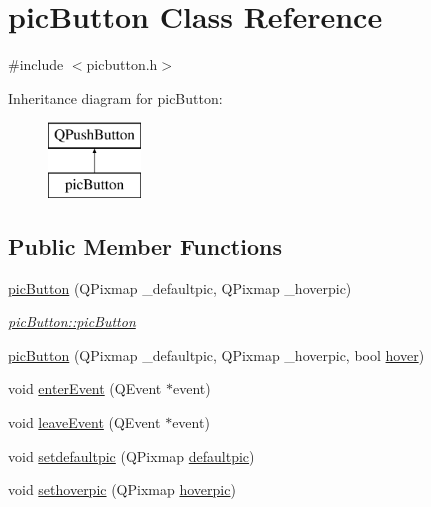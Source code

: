 \hypertarget{classpic_button}{}\section{pic\+Button Class Reference}
\label{classpic_button}


{\ttfamily \#include $<$picbutton.\+h$>$}

Inheritance diagram for pic\+Button\+:\begin{figure}[H]
\begin{center}
\leavevmode
\includegraphics[height=2.000000cm]{classpic_button}
\end{center}
\end{figure}
\subsection*{Public Member Functions}
\begin{DoxyCompactItemize}
\item 
\hyperlink{classpic_button_a1d5dc5f3e6a73e24dd873fb6a33a3e7f}{pic\+Button} (Q\+Pixmap \+\_\+defaultpic, Q\+Pixmap \+\_\+hoverpic)
\begin{DoxyCompactList}\small\item\em \hyperlink{classpic_button_a1d5dc5f3e6a73e24dd873fb6a33a3e7f}{pic\+Button\+::pic\+Button} \end{DoxyCompactList}\item 
\hyperlink{classpic_button_a6c7eca4ea10251d19dde58edea0f0e12}{pic\+Button} (Q\+Pixmap \+\_\+defaultpic, Q\+Pixmap \+\_\+hoverpic, bool \hyperlink{classpic_button_ab011ab567cb14054023cc46cfc3110c1}{hover})
\item 
void \hyperlink{classpic_button_a8e06509469d6b2c5efe9c58558209350}{enter\+Event} (Q\+Event $\ast$event)
\item 
void \hyperlink{classpic_button_a22c110a8f610d4a315b2c260e7d1f2b9}{leave\+Event} (Q\+Event $\ast$event)
\item 
void \hyperlink{classpic_button_a38c0a41c10500e605cda766094ee00a5}{setdefaultpic} (Q\+Pixmap \hyperlink{classpic_button_a13f03c5d3c47b0a10b3798f9588a8cf5}{defaultpic})
\item 
void \hyperlink{classpic_button_a632d61dedf5693fcade81c6a998a377d}{sethoverpic} (Q\+Pixmap \hyperlink{classpic_button_a6e387b9fc6348b681a786db8452fbc9d}{hoverpic})
\end{DoxyCompactItemize}
